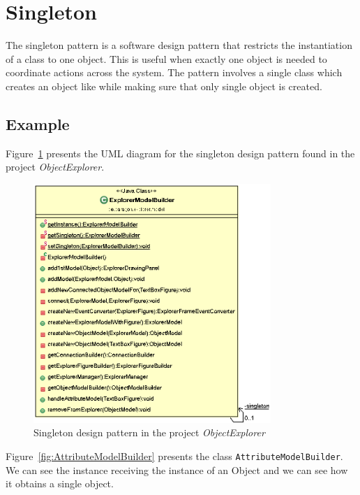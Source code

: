 \section{Singleton}

The singleton pattern is a software design pattern that restricts the instantiation of a class to one object. This is useful when exactly one object is needed to coordinate actions across the system. The pattern involves a single class which creates an object like while making sure that only single object is created.

\subsection*{Example}

Figure~\ref{fig:singleton} presents the UML diagram for the singleton design pattern found in the project \textit{ObjectExplorer}.

\begin{figure}[htb]
    \centering
    \includegraphics[width=9cm]{images/Singleton.png}
    \caption{Singleton design pattern in the project \textit{ObjectExplorer}}
    \label{fig:singleton}
\end{figure}
\FloatBarrier

Figure~\ref{fig:AttributeModelBuilder} presents the class \texttt{AttributeModelBuilder}. We can see the instance receiving the instance of an Object and we can see how it obtains a single object.


